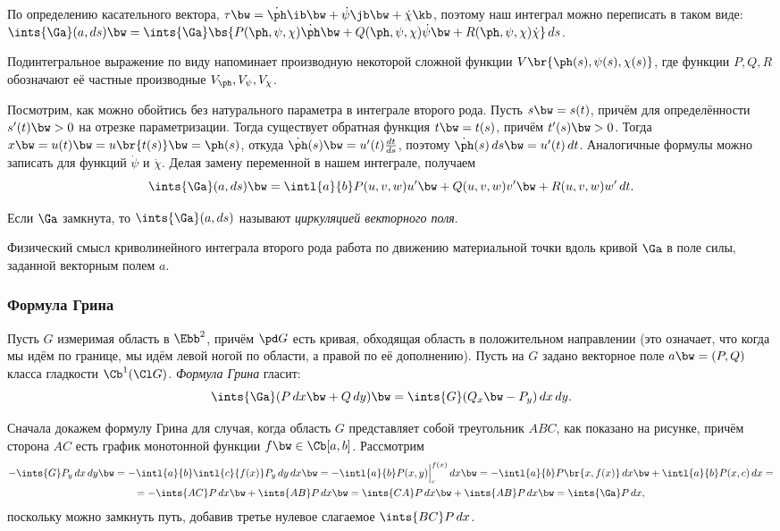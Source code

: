 \documentclass[a4paper]{article}
\begin{document}
По определению касательного вектора, $\tau \bw= \dot{\ph}\ib \bw+ \dot{\psi}\jb \bw+ \dot{\chi}\kb$, поэтому
наш интеграл можно переписать в таком виде: $\ints{\Ga}(a,ds) \bw= \ints{\Ga}\bs{P(\ph,\psi,\chi)\dot{\ph}
\bw+ Q(\ph,\psi,\chi)\dot{\psi} \bw+ R(\ph,\psi,\chi)\dot{\chi}}\,ds$.

\begin{note}
Подинтегральное выражение по виду напоминает производную некоторой сложной функции $V\br{\ph(s),
\psi(s),\chi(s)}$, где функции $P,Q,R$ обозначают её частные производные $V_\ph, V_\psi, V_\chi$.
\end{note}

Посмотрим, как можно обойтись без натурального параметра в интеграле второго рода. Пусть $s \bw= s(t)$,
причём для определённости $s'(t) \bw> 0$ на отрезке параметризации. Тогда существует обратная функция $t \bw=
t(s)$, причём $t'(s) \bw> 0$. Тогда $x \bw= u(t) \bw= u\br{t(s)} \bw= \ph(s)$, откуда $\dot{\ph}(s) \bw=
u'(t)\frac{dt}{ds}$, поэтому $\dot{\ph}(s)\,ds \bw= u'(t)\,dt$. Аналогичные формулы можно записать
для функций $\dot{\psi}$ и $\dot{\chi}$. Делая замену переменной в нашем интеграле, получаем
$$
  \ints{\Ga}(a,ds) \bw= \intl{a}{b} P(u,v,w)u' \bw+ Q(u,v,w)v' \bw+ R(u,v,w)w' \,dt.
$$

\begin{df}
Если $\Ga$ замкнута, то $\ints{\Ga}(a,ds)$ называют \emph{циркуляцией векторного поля}.
\end{df}

\begin{note}
Физический смысл криволинейного интеграла второго рода работа по движению материальной точки
вдоль кривой $\Ga$ в поле силы, заданной векторным полем $a$.
\end{note}

\subsubsection{Формула Грина}

Пусть $G$ измеримая область в $\Ebb^2$, причём $\pd G$ есть кривая, обходящая область в
положительном направлении (это означает, что когда мы идём по границе, мы идём левой ногой по
области, а правой по её дополнению). Пусть на $G$ задано векторное поле $a \bw= (P, Q)$ класса
гладкости $\Cb^1(\Cl G)$. \emph{Формула Грина} гласит:
$$\ints{\Ga}(P\,d x \bw+ Q\,d y) \bw= \ints{G}(Q_x \bw- P_y)\,dx\,dy.$$

\hangindent=-38mm
Сначала докажем формулу Грина для случая,
когда область $G$ представляет собой треугольник $ABC$, как показано на рисунке, причём сторона $AC$ есть
график монотонной функции $f \bw\in \Cb[a,b]$. Рассмотрим
\begin{multline*}
-\ints{G}P_y\,dx\,dy \bw=
-\intl{a}{b}\intl{c}{f(x)}P_y\,dy\,dx \bw= -\intl{a}{b}P(x,y)\Bigl\rvert_c^{f(x)}\,dx \bw=
-\intl{a}{b}P\br{x,f(x)}\,dx \bw+\intl{a}{b}P(x,c)\,dx =\\
= -\ints{AC}P\,dx \bw+ \ints{A B}P\,d x \bw= \ints{CA}P\,d x \bw+ \ints{A B}P\,d x \bw= \ints{\Ga}P \,dx,
\end{multline*}
поскольку можно замкнуть путь, добавив третье нулевое слагаемое $\ints{BC}P\,d x$.
\end{document}
